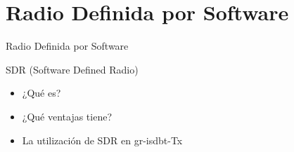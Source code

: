 \section{Radio Definida por Software}


\begin{frame}{Radio Definida por Software}
\begin{block}{SDR (Software Defined Radio)}
	\begin{itemize}
		\item {	¿Qué es? }
		\item { ¿Qué ventajas tiene? }
		\item { La utilización de SDR en gr-isdbt-Tx}
	\end{itemize}
\end{block}
\end{frame}

